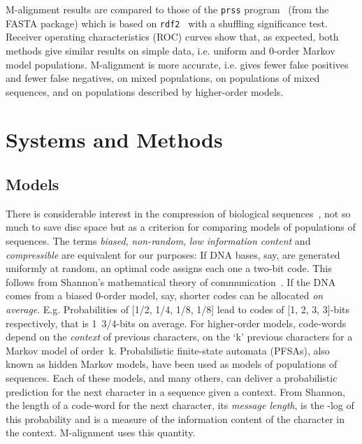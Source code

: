 \documentclass[letterpaper,11pt,oneside]{article}
\begin{document}
M-alignment results are compared to those of
the {\tt prss} program~\cite{smith81} (from the FASTA package) which
is based on {\tt rdf2}~\cite{pearson88} with a shuffling significance test.
Receiver operating characteristics (ROC) curves show that, as expected,
both methods give similar results
on simple data, i.e. uniform and 0-order Markov model populations.
M-alignment is more accurate,
i.e. gives fewer false positives and fewer false negatives,
on mixed populations,
on populations of mixed sequences, and
on populations described by higher-order models.


\section{Systems and Methods} \label{sec:sys}

\subsection{Models} \label{sec:models}

There is considerable interest in the compression of biological
sequences~\cite{grumbach94,loewenstern96,rivals97,allison00},
not so much to save disc space but
as a criterion for comparing models of populations of sequences.
The terms {\em biased}, {\em non-random}, {\em low information content}
and {\em compressible} are equivalent for our purposes:
If DNA bases, say, are generated uniformly at random, an optimal code
assigns each one a two-bit code.
This follows from
Shannon's mathematical theory of communication~\cite{shannon49}.
If the DNA comes from a biased 0-order model, say,
shorter codes can be allocated {\em on average}.
E.g. Probabilities of [1/2, 1/4, 1/8, 1/8] lead to codes of
[1, 2, 3, 3]-bits respectively, that is 1~3/4-bits on average.
For higher-order models, code-words depend on the {\em context}
of previous characters, on the `k' previous characters
for a Markov model of order~k.
Probabilistic finite-state automata (PFSAs),
also known as hidden Markov models,
have been used as models \cite{georgeff84} of populations of sequences.
Each of these models, and many others, can deliver a probabilistic
prediction for the next character in a sequence given a context.
From Shannon, the length of a code-word for the next character,
its {\em message length}, is the -log of this probability and
is a measure of the information content of the character in the context.
M-alignment uses this quantity.
\end{document}
